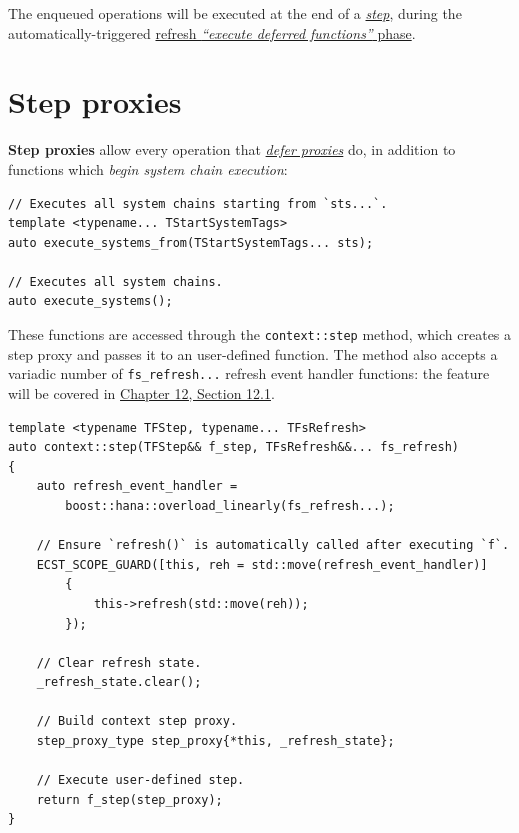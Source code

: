\documentclass[twoside, 12pt, a4paper, openany]{book}
\begin{document}
The enqueued operations will be executed at the end of a
\protect\hyperlink{step_stage}{\emph{step}}, during the
automatically-triggered \protect\hyperlink{flow_exec_dfuncs}{refresh
\emph{``execute deferred functions''} phase}.

\hypertarget{proxies_step}{\section{Step proxies}\label{proxies_step}}

\textbf{Step proxies} allow every operation that
\protect\hyperlink{proxies_defer}{\emph{defer proxies}} do, in addition
to functions which \emph{begin system chain execution}:

\begin{verbatim}
// Executes all system chains starting from `sts...`.
template <typename... TStartSystemTags>
auto execute_systems_from(TStartSystemTags... sts);

// Executes all system chains.
auto execute_systems();
\end{verbatim}

These functions are accessed through the
\texttt{context::step}
method, which creates a step proxy and passes it to an user-defined
function. The method also accepts a variadic number of
\texttt{fs_refresh...}
refresh event handler functions: the feature will be covered in
\protect\hyperlink{chap_advfeats}{Chapter 12, Section 12.1}.

\begin{verbatim}
template <typename TFStep, typename... TFsRefresh>
auto context::step(TFStep&& f_step, TFsRefresh&&... fs_refresh)
{
    auto refresh_event_handler =
        boost::hana::overload_linearly(fs_refresh...);

    // Ensure `refresh()` is automatically called after executing `f`.
    ECST_SCOPE_GUARD([this, reh = std::move(refresh_event_handler)]
        {
            this->refresh(std::move(reh));
        });

    // Clear refresh state.
    _refresh_state.clear();

    // Build context step proxy.
    step_proxy_type step_proxy{*this, _refresh_state};

    // Execute user-defined step.
    return f_step(step_proxy);
}
\end{verbatim}
\end{document}
